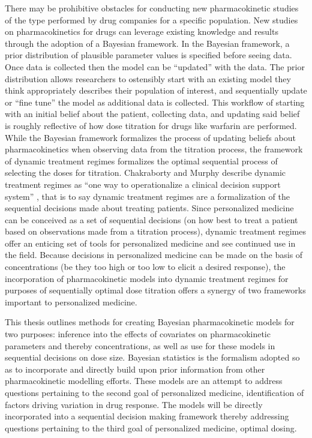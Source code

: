 There may be prohibitive obstacles for conducting new pharmacokinetic studies of the type performed by drug companies for a specific population. New studies on pharmacokinetics for drugs can leverage existing knowledge and results through the adoption of a Bayesian framework.  In the Bayesian framework, a prior distribution of plausible parameter values is specified before seeing data.  Once data is collected then the model can be ``updated'' with the data.  The prior distribution allows researchers to ostensibly start with an existing model they think appropriately describes their population of interest, and sequentially update or ``fine tune'' the model as additional data is collected. This workflow of starting with an initial belief about the patient, collecting data, and updating said belief is roughly reflective of how dose titration for drugs like warfarin are performed.   While the Bayesian framework formalizes the process of updating beliefs about pharmacokinetics when observing data from the titration process, the framework of dynamic treatment regimes formalizes the optimal sequential process of selecting the doses for titration.  Chakraborty and Murphy describe dynamic treatment regimes as ``one way to operationalize a clinical decision support system'' \cite{chakraborty_dynamic_2014}, that is to say dynamic treatment regimes are a formalization of the sequential decisions made about treating patients.  Since personalized medicine can be conceived as a set of sequential decisions (on how best to treat a patient based on observations made from a titration process), dynamic treatment regimes offer an enticing set of tools for personalized medicine and see continued use in the field.  Because decisions in personalized medicine can be made on the basis of concentrations (be they too high or too low to elicit a desired response), the incorporation of pharmacokinetic models into dynamic treatment regimes for purposes of sequentially optimal dose titration offers a synergy of two frameworks important to personalized medicine.

This thesis outlines methods for creating Bayesian pharmacokinetic models for two purposes: inference into the effects of covariates on pharmacokinetic parameters and thereby concentrations, as well as use for these models in sequential decisions on dose size.    Bayesian statistics is the formalism adopted so as to incorporate and directly build upon prior information from other pharmacokinetic modelling efforts.  These models are an attempt to address questions pertaining to the second goal of personalized medicine, identification of factors driving variation in drug response.  The models will be directly incorporated into a sequential decision making framework thereby addressing questions pertaining to the third goal of personalized medicine, optimal dosing.


